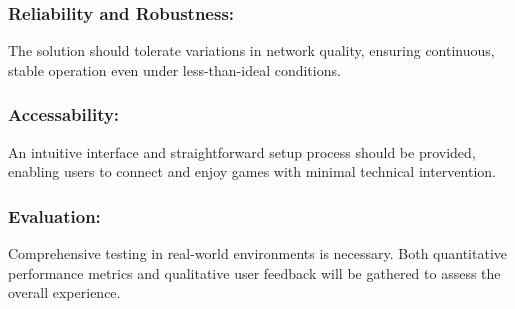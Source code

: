 \subsubsection{Reliability and Robustness:}
	      The solution should tolerate variations in network quality, ensuring continuous, stable operation even under less-than-ideal conditions.

\subsubsection{Accessability:}
	      An intuitive interface and straightforward setup process should be provided, enabling users to connect and enjoy games with minimal technical intervention.

\subsubsection{Evaluation:}
	      Comprehensive testing in real-world environments is necessary. Both quantitative performance metrics and qualitative user feedback will be gathered to assess the overall experience.


